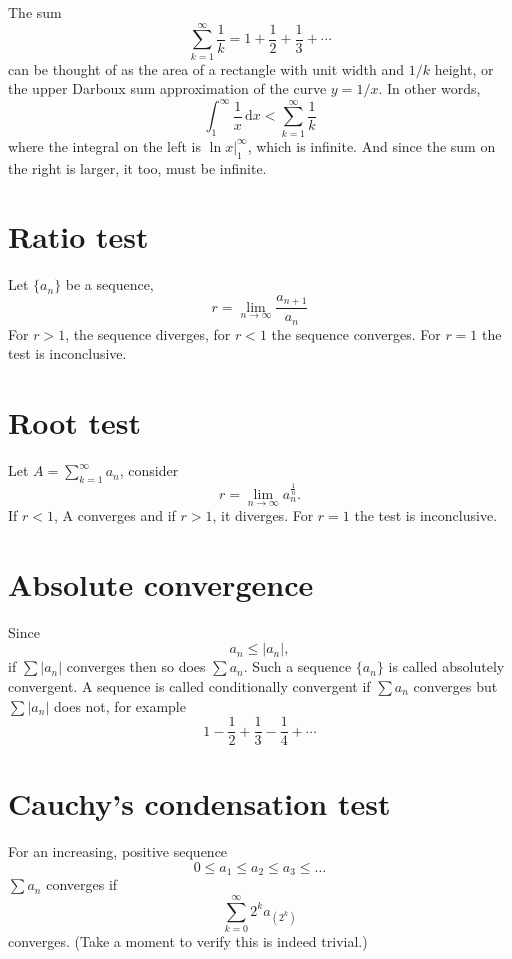 \documentclass[]{article}
\begin{document}

The sum \[\sum_{k=1}^{\infty}\frac{1}{k}=1+\frac{1}{2}+\frac{1}{3}+\cdots\] can be thought of as the area of a rectangle with unit width and $1/k$ height, or the upper Darboux sum approximation of the curve $y=1/x$. In other words, \[\int_{1}^{\infty}\frac{1}{x}\,\mathrm{d}x < \sum_{k=1}^{\infty}\frac{1}{k}\] where the integral on the left is $\ln x \big|_{1}^{\infty}$, which is infinite. And since the sum on the right is larger, it too, must be infinite.

\section{Ratio test}
Let $\{a_n\}$ be a sequence, \[r=\lim_{n\to\infty}\frac{a_{n+1}}{a_n}\] For $r>1$, the sequence diverges, for $r<1$ the sequence converges. For $r=1$ the test is inconclusive.

\section{Root test}
Let $A=\sum_{k=1}^{\infty}a_n$, consider \[r=\lim_{n\to\infty}a_n^\frac{1}{n}.\] If $r<1$, A converges and if $r>1$, it diverges. For $r=1$ the test is inconclusive.

\section{Absolute convergence}
Since \[a_n\le\lvert a_n \rvert,\] if \(\sum\lvert a_n \rvert\) converges then so does $\sum a_n$. Such a sequence $\{a_n\}$ is called absolutely convergent. A sequence is called conditionally convergent if $\sum a_n$ converges but $\sum\lvert a_n \rvert$ does not, for example \[1-\frac{1}{2}+\frac{1}{3}-\frac{1}{4}+\cdots\]

\section{Cauchy's condensation test}
For an increasing, positive sequence \[0\le a_1 \le a_2 \le a_3 \le\ldots\]
$\sum a_n$ converges if \[\sum_{k=0}^{\infty}2^ka_{(2^k)}\] converges. (Take a moment to verify this is indeed trivial.)
\end{document}
